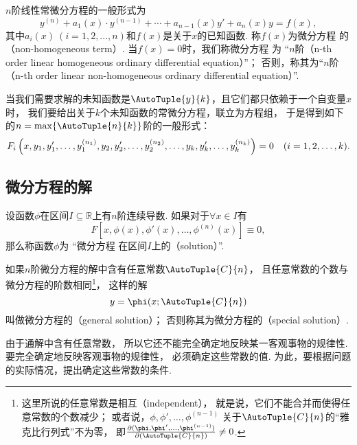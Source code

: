 \(n\)阶线性常微分方程的一般形式为
\begin{equation}\label{equation:微分方程.线性常微分方程的一般形式}
	y^{(n)} + a_1(x) \cdot y^{(n-1)}
	+ \dotsb + a_{n-1}(x) y'
	+ a_n(x) y
	= f(x),
\end{equation}
其中\(a_i(x)\ (i=1,2,\dotsc,n)\)和\(f(x)\)是关于\(x\)的已知函数.
称\(f(x)\)为微分方程  的（non-homogeneous term）.
当\(f(x) = 0\)时，我们称微分方程  为
“\(n\)阶（n-th order linear homogeneous ordinary differential equation）”；
否则，称其为“\(n\)阶（n-th order linear non-homogeneous ordinary differential equation）”.

当我们需要求解的未知函数是\(\AutoTuple{y}{k}\)，且它们都只依赖于一个自变量\(x\)时，
我们要给出关于\(k\)个未知函数的常微分方程，联立为方程组，
于是得到如下的\(n = \max\{\AutoTuple{n}{k}\}\)阶的一般形式：
\[
	\def\y#1{y_{#1},y_{#1}',\dotsc,y_{#1}^{(n_#1)}}%
	F_i\left(x,\y{1},\y{2},\dotsc,\y{k}\right)=0
	\quad(i=1,2,\dotsc,k).
\]

\subsection{微分方程的解}
\begin{definition}
设函数\(\phi\)在区间\(I\subseteq\mathbb{R}\)上有\(n\)阶连续导数.
如果对于\(\forall x \in I\)有\[
	F\left[x,\phi(x),\phi'(x),\dotsc,\phi^{(n)}(x)\right]\equiv0,
\]
那么称函数\(\phi\)为
“微分方程 
在区间\(I\)上的（solution）”.

如果\(n\)阶微分方程的解中含有任意常数\(\AutoTuple{C}{n}\)，
且任意常数的个数与微分方程的阶数相同\footnote{%
这里所说的任意常数是相互（independent），
就是说，它们不能合并而使得任意常数的个数减少；
或者说，\(\phi,\phi',\dotsc,\phi^{(n-1)}\)
关于\(\AutoTuple{C}{n}\)的“雅克比行列式”不为零，
即\(\jacobi{\phi,\phi',\dotsc,\phi^{(n-1)}}{\AutoTuple{C}{n}} \neq 0\).}，
这样的解\[
	y = \phi(x;\AutoTuple{C}{n})
\]叫做微分方程的（general solution）；
否则称其为微分方程的（special solution）.
\end{definition}

由于通解中含有任意常数，
所以它还不能完全确定地反映某一客观事物的规律性.
要完全确定地反映客观事物的规律性，
必须确定这些常数的值.
为此，要根据问题的实际情况，提出确定这些常数的条件.

